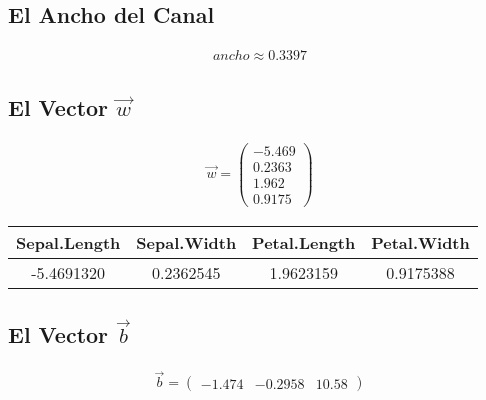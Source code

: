 \documentclass[fleqn]{llncs}
\begin{document}
\subsection{El Ancho del Canal}
\begin{align*}
	ancho \approx 0.3397
\end{align*}

\subsection{El Vector $\overrightarrow{w}$}
\begin{align*}
	\overrightarrow{w} =
	\begin{pmatrix}
		-5.469 \\
		0.2363 \\
		1.962 \\
		0.9175
	\end{pmatrix}
\end{align*}
\begin{tabular}{c | c | c | c}
	Sepal.Length & Sepal.Width & Petal.Length & Petal.Width \\
	\hline
	-5.4691320 & 0.2362545 & 1.9623159 & 0.9175388 \\
\end{tabular}

\subsection{El Vector $\overrightarrow{b}$}
\begin{align*}
	\overrightarrow{b} =
	\begin{pmatrix}
		-1.474 & -0.2958 & 10.58
	\end{pmatrix}
\end{align*}
\end{document}
